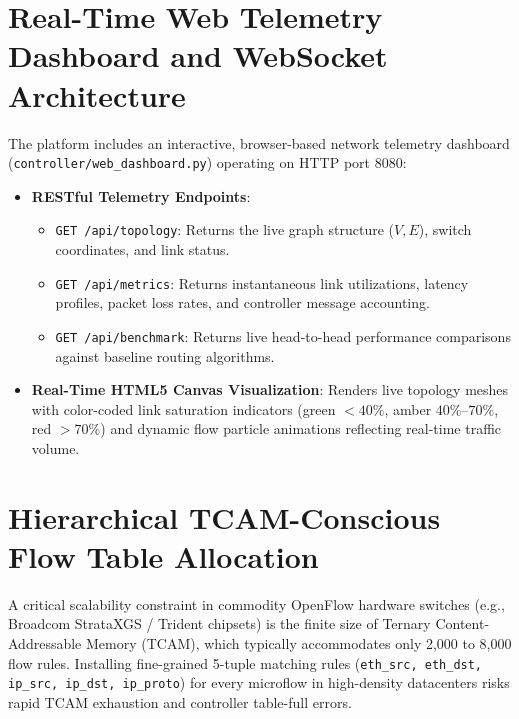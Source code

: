\section{Real-Time Web Telemetry Dashboard and WebSocket Architecture}
The platform includes an interactive, browser-based network telemetry dashboard (\texttt{controller/web\_dashboard.py}) operating on HTTP port 8080:
\begin{itemize}
    \item \textbf{RESTful Telemetry Endpoints}:
    \begin{itemize}
        \item \texttt{GET /api/topology}: Returns the live graph structure ($V, E$), switch coordinates, and link status.
        \item \texttt{GET /api/metrics}: Returns instantaneous link utilizations, latency profiles, packet loss rates, and controller message accounting.
        \item \texttt{GET /api/benchmark}: Returns live head-to-head performance comparisons against baseline routing algorithms.
    \end{itemize}
    \item \textbf{Real-Time HTML5 Canvas Visualization}: Renders live topology meshes with color-coded link saturation indicators (green $< 40\%$, amber $40\%$--$70\%$, red $> 70\%$) and dynamic flow particle animations reflecting real-time traffic volume.
\end{itemize}

\section{Hierarchical TCAM-Conscious Flow Table Allocation}
\label{sec:tcam_conservation_architecture}
A critical scalability constraint in commodity OpenFlow hardware switches (e.g., Broadcom StrataXGS / Trident chipsets) is the finite size of Ternary Content-Addressable Memory (TCAM), which typically accommodates only 2,000 to 8,000 flow rules. Installing fine-grained 5-tuple matching rules (\texttt{eth\_src, eth\_dst, ip\_src, ip\_dst, ip\_proto}) for every microflow in high-density datacenters risks rapid TCAM exhaustion and controller table-full errors.


